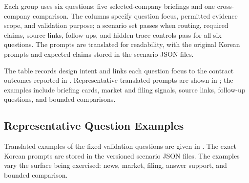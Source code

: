 Each group uses six questions: five selected-company briefings and one cross-company comparison. The columns specify question focus, permitted evidence scope, and validation purpose; a scenario set passes when routing, required claims, source links, follow-ups, and hidden-trace controls pass for all six questions. The prompts are translated for readability, with the original Korean prompts and expected claims stored in the scenario JSON files.

The table records design intent and links each question focus to the contract outcomes reported in . Representative translated prompts are shown in ; the examples include briefing cards, market and filing signals, source links, follow-up questions, and bounded comparisons.

\subsection{Representative Question Examples}
\label{app:question-examples}

Translated examples of the fixed validation questions are given in . The exact Korean prompts are stored in the versioned scenario JSON files. The examples vary the surface being exercised: news, market, filing, answer support, and bounded comparison.

